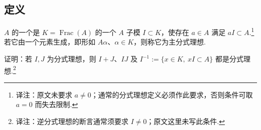 \subsection{定义}\label{sec:nt-3-2-1}
\begin{definition*}
$A$ 的一个是 $K=\operatorname{Frac}(A)$ 的一个 $A$ 子模 $I\subset K$，使存在 $a\in A$ 满足 $aI\subset A$.\footnote{译注：原文未要求 $a\ne0$；通常的分式理想定义必须作此要求，否则条件可取 $a=0$ 而失去限制.}
若它由一个元素生成，即形如 $A\alpha$、$\alpha\in K$，则称它为主分式理想.
\end{definition*}
\begin{exercise*}
证明：若 $I,J$ 为分式理想，则 $I+J$、$IJ$ 及 $I^{-1}:=\{x\in K,\ xI\subset A\}$ 都是分式理想.\footnote{译注：逆分式理想的断言通常须要求 $I\ne0$；原文这里未写此条件.}
\end{exercise*}

